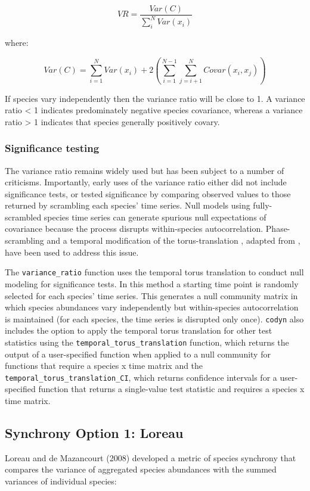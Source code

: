 \documentclass[11pt]{article}
\begin{document}
$$ VR = \frac{Var(C)}{\sum_{i}^{N} Var(x_i)} $$

where:

$$ Var(C)  = \sum_{i = 1}^{N} Var(x_i) + 2\left(\sum_{i = 1}^{N - 1} \sum_{j = i + 1}^{N} Covar(x_i, x_j)\right) $$ 


If species vary independently then the variance ratio will be close to 1. A variance ratio  < 1 indicates predominately negative species covariance, whereas a variance ratio > 1 indicates that species generally positively covary. 

\subsubsection{Significance testing}
The variance ratio remains widely used but has been subject to a number of criticisms. Importantly, early uses of the variance ratio either did not include significance tests, or tested significance by comparing observed values to those returned by scrambling each species' time series. Null models using fully-scrambled species time series can generate spurious null expectations of covariance because the process disrupts within-species autocorrelation. Phase-scrambling \cite{Grman2010} and a temporal modification of the torus-translation \cite{hallett2014}, adapted from \cite{harms2001}, have been used to address this issue. 

The \texttt{variance\_ratio} function uses the temporal torus translation to conduct null modeling for significance tests. In this method a starting time point is randomly selected for each species' time series. This generates a null community matrix in which species abundances vary independently but within-species autocorrelation is maintained (for each species, the time series is disrupted only once). \texttt{codyn} also includes the option to apply the temporal torus translation for other test statistics using the \texttt{temporal\_torus\_translation} function, which returns the output of a user-specified function when applied to a null community for functions that require a species x time matrix and the \texttt{temporal\_torus\_translation\_CI}, which returns  confidence intervals for a user-specified function that returns a single-value test statistic and requires a species x time matrix.

\subsection{Synchrony Option 1: Loreau}
Loreau and de Mazancourt (2008) developed a metric of species synchrony that compares the variance of aggregated species abundances with the summed variances of individual species:
\end{document}
